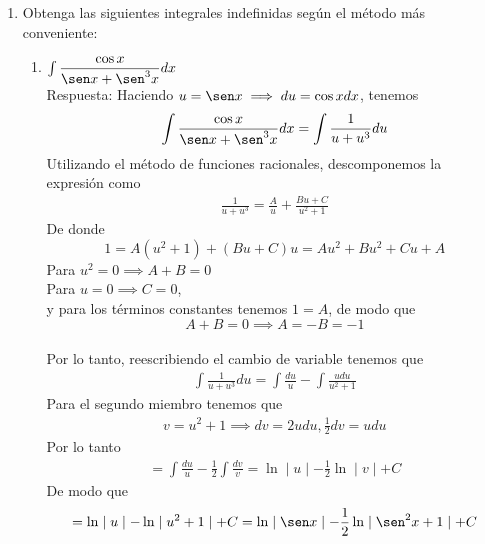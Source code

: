 \documentclass[a4paper,12pt]{report}
\begin{document}
\begin{enumerate}
\begin{enumerate}
	\end{enumerate}
	\newpage
	\item Obtenga las siguientes integrales indefinidas según el método más conveniente:
	\begin{enumerate}
		\item \(\int \dfrac{\cos x}{ \sen x + \sen^3 x} dx \)
		\\ \vspace{0.5cm}
		Respuesta: Haciendo \(u = \sen x \implies du=\cos x dx\), tenemos
		\begin{align*}
			\int \frac{\cos x}{ \sen x + \sen^3 x} dx = \int \frac{1}{u + u^3} du
		\end{align*}
		Utilizando el método de funciones racionales, descomponemos la expresión como
		\begin{align*}
			\frac{1}{u + u^3} = \frac{A}{u} + \frac{Bu + C}{u^2 + 1}
		\end{align*}
		De donde \\
		\[ 1 = A(u^2 + 1) + (Bu + C)u = Au^2 + Bu^2 + Cu + A \]
		Para $u^2 = 0 \implies A+B =0$ \\
		Para $u=0 \implies C = 0$,\\
		y para los términos constantes tenemos $1 = A$, de modo que 
		\[ A+B=0 \implies A =-B = -1\]\\
		Por lo tanto, reescribiendo el cambio de variable tenemos que
		\begin{align*}
			\int \frac{1}{u + u^3} du = \int \frac{du}{u} - \int \frac{udu}{u^2 +1}
		\end{align*}
		Para el segundo miembro tenemos que 
		\begin{align*}
			v = u^2 + 1 \implies dv=2udu, \frac{1}{2}dv = udu
		\end{align*}
		Por lo tanto
		\begin{align*}
			= \int \frac{du}{u} - \frac{1}{2} \int \frac{dv}{v} = \ln \mid u \mid - \frac{1}{2} \ln \mid v \mid + C
		\end{align*}
		De modo que 
		\begin{align*}
			 = \ln \mid u \mid - \ln \mid u^2 + 1 \mid +C = \ln \mid \sen x \mid - \frac{1}{2}  \ln \mid \sen^2 x +1 \mid +C
		\end{align*}
		

\end{enumerate}
\end{enumerate}
\end{document}
